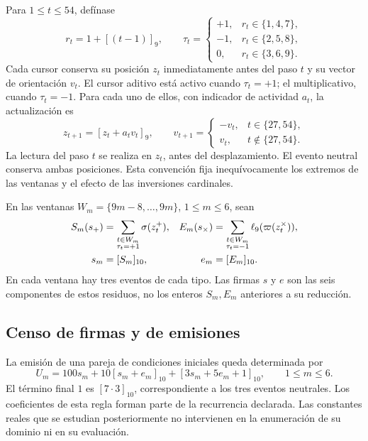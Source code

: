 Para $1\le t\le54$, defínase
\[
 r_t=1+[(t-1)]_9,
 \qquad
 \tau_t=
 \begin{cases}
 +1,&r_t\in\{1,4,7\},\\
 -1,&r_t\in\{2,5,8\},\\
 0,&r_t\in\{3,6,9\}.
 \end{cases}
\]
Cada cursor conserva su posición $z_t$ inmediatamente antes del paso
$t$ y su vector de orientación $v_t$. El cursor aditivo está activo
cuando $\tau_t=+1$; el multiplicativo, cuando $\tau_t=-1$. Para cada
uno de ellos, con indicador de actividad $a_t$, la actualización es
\begin{equation}
 z_{t+1}=[z_t+a_tv_t]_9,
 \qquad
 v_{t+1}=
 \begin{cases}
 -v_t,&t\in\{27,54\},\\
 v_t,&t\notin\{27,54\}.
 \end{cases}
 \label{iii:nf-actualizacion}
\end{equation}
La lectura del paso $t$ se realiza en $z_t$, antes del desplazamiento.
El evento neutral conserva ambas posiciones. Esta convención fija
inequívocamente los extremos de las ventanas y el efecto de las
inversiones cardinales.

En las ventanas $W_m=\{9m-8,\ldots,9m\}$, $1\le m\le6$, sean
\begin{align}
 S_m(s_+)&=\sum_{\substack{t\in W_m\\\tau_t=+1}}
                 \sigma(z_t^+),&
 E_m(s_\times)&=\sum_{\substack{t\in W_m\\\tau_t=-1}}
                 \ell_9(\varpi(z_t^\times)),
 \label{iii:nf-firmas}\\
 s_m&=[S_m]_{10},&e_m&=[E_m]_{10}.\notag
\end{align}
En cada ventana hay tres eventos de cada tipo. Las firmas $s$ y $e$
son las seis componentes de estos residuos, no los enteros $S_m,E_m$
anteriores a su reducción.

\subsection{Censo de firmas y de emisiones}

La emisión de una pareja de condiciones iniciales queda determinada por
\begin{equation}
 U_m=100s_m+10[s_m+e_m]_{10}+[3s_m+5e_m+1]_{10},
 \qquad 1\le m\le6.
 \label{iii:nf-emision}
\end{equation}
El término final $1$ es $[7\cdot3]_{10}$, correspondiente a los tres
eventos neutrales. Los coeficientes de esta regla forman parte de la
recurrencia declarada. Las constantes reales que se estudian posteriormente
no intervienen en la enumeración de su dominio ni en su evaluación.

